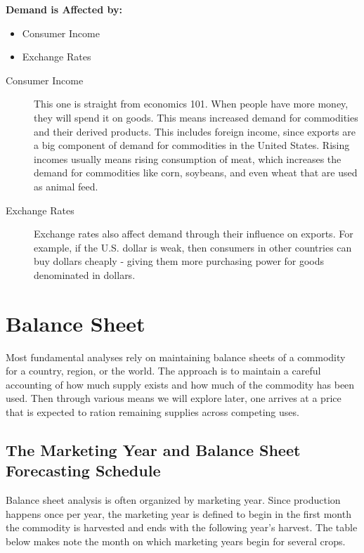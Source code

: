 \documentclass[]{book}
\providecommand{\tightlist}{%
  \setlength{\itemsep}{0pt}\setlength{\parskip}{0pt}}
\theoremstyle{definition}
\theoremstyle{definition}
\theoremstyle{remark}
\begin{document}
\textbf{Demand is Affected by:}

\begin{itemize}
\tightlist
\item
  Consumer Income
\item
  Exchange Rates
\end{itemize}

\begin{description}
\item[Consumer Income]
This one is straight from economics 101. When people have more money,
they will spend it on goods. This means increased demand for commodities
and their derived products. This includes foreign income, since exports
are a big component of demand for commodities in the United States.
Rising incomes usually means rising consumption of meat, which increases
the demand for commodities like corn, soybeans, and even wheat that are
used as animal feed.
\item[Exchange Rates]
Exchange rates also affect demand through their influence on exports.
For example, if the U.S. dollar is weak, then consumers in other
countries can buy dollars cheaply - giving them more purchasing power
for goods denominated in dollars.
\end{description}

\section{Balance Sheet}\label{balance-sheet}

Most fundamental analyses rely on maintaining balance sheets of a
commodity for a country, region, or the world. The approach is to
maintain a careful accounting of how much supply exists and how much of
the commodity has been used. Then through various means we will explore
later, one arrives at a price that is expected to ration remaining
supplies across competing uses.

\subsection{The Marketing Year and Balance Sheet Forecasting
Schedule}\label{the-marketing-year-and-balance-sheet-forecasting-schedule}

Balance sheet analysis is often organized by marketing year. Since
production happens once per year, the marketing year is defined to begin
in the first month the commodity is harvested and ends with the
following year's harvest. The table below makes note the month on which
marketing years begin for several crops.
\end{document}
